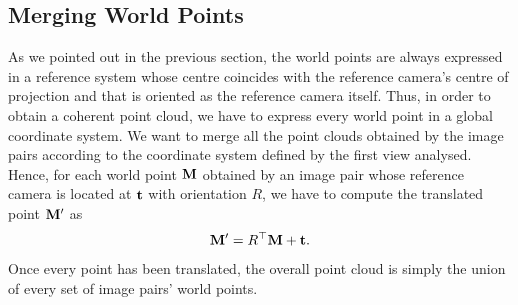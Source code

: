 \subsection{Merging World Points}\label{subsec:merging_worldPoints}
As we pointed out in the previous section, the world points are always
expressed in a reference system whose centre coincides with the reference
camera's centre of projection and that is oriented as the reference camera
itself.
Thus, in order to obtain a coherent point cloud, we have to express every world
point in a global coordinate system.
We want to merge all the point clouds obtained by the image pairs
according to the coordinate system defined
by the first view analysed. Hence, for each world point $\mathbf{M}$ obtained by
an image pair whose reference camera is located at $\mathbf{t}$ with orientation
$R$, we have to compute the translated point $\mathbf{M}^\prime$ as
%
\begin{equation*}
\mathbf{M}^\prime = R^\top \mathbf{M} + \mathbf{t} \text{.}
\end{equation*}
%
\noindent Once every point has been translated, the overall point cloud is
simply the union of every set of image pairs' world points.
